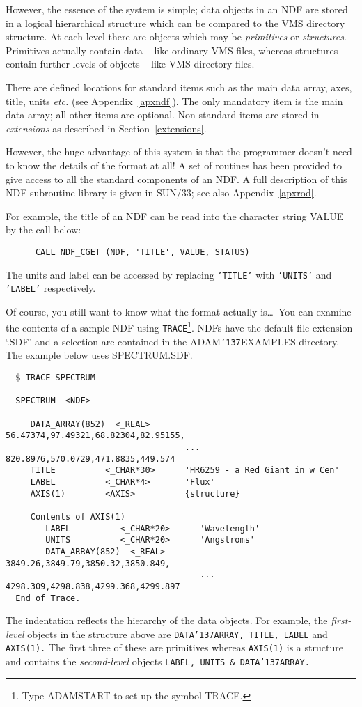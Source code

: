 \documentclass[twoside,11pt]{article}
\renewcommand{\_}{{\tt\char'137}}
\newcommand{\xref}[3]{#1}
\begin{document}
However, the essence of the system is simple; data objects in an NDF
are stored in a
logical hierarchical structure which can be compared to the VMS
directory structure.
At each level there are objects which may be {\sl primitives\/}
or {\sl structures}.
Primitives actually contain data -- like ordinary VMS files, whereas
structures contain further levels of objects -- like VMS directory files.

There are defined locations for standard items such as the main data array,
axes, title, units {\it etc.} (see Appendix~\ref{apxndf}).
The only mandatory item is the main data
array; all other items are optional.
Non-standard items are stored in {\sl extensions\/}
as described in Section~\ref{extensions}.

However, the huge advantage of this system is that the programmer
doesn't need to know the details of the
format at all!
A set of routines has been provided to give access
to all the standard components of an NDF.
A full description of this NDF subroutine library is given in
\xref{SUN/33}{sun33}{};
see also Appendix~\ref{apxrod}.


For example, the title of an NDF can be read into the character string
VALUE by the call below:
\begin{verbatim}
      CALL NDF_CGET (NDF, 'TITLE', VALUE, STATUS)
\end{verbatim}
The units and label can be accessed by replacing
{\tt 'TITLE'} with {\tt 'UNITS'} and {\tt 'LABEL'} respectively.

Of course, you still want to know what the format actually is\ldots\
You can examine the contents of a sample NDF
using {\tt TRACE}\footnote{Type ADAMSTART to set up the symbol TRACE.}.
NDFs have the default file extension `.SDF' and a selection are
contained in the  ADAM\_EXAMPLES directory.
The example below uses SPECTRUM.SDF.
\begin{verbatim}
  $ TRACE SPECTRUM

  SPECTRUM  <NDF>

     DATA_ARRAY(852)  <_REAL>       56.47374,97.49321,68.82304,82.95155,
                                    ... 820.8976,570.0729,471.8835,449.574
     TITLE          <_CHAR*30>      'HR6259 - a Red Giant in w Cen'
     LABEL          <_CHAR*4>       'Flux'
     AXIS(1)        <AXIS>          {structure}

     Contents of AXIS(1)
        LABEL          <_CHAR*20>      'Wavelength'
        UNITS          <_CHAR*20>      'Angstroms'
        DATA_ARRAY(852)  <_REAL>       3849.26,3849.79,3850.32,3850.849,
                                       ... 4298.309,4298.838,4299.368,4299.897
  End of Trace.
\end{verbatim}
The indentation reflects the hierarchy of the data objects.
For example, the {\sl first-level\/} objects in the structure above are
{\tt  DATA\_ARRAY, TITLE, LABEL} and {\tt AXIS(1).}
The first three of these are primitives whereas
{\tt AXIS(1)} is a structure and contains the {\sl second-level\/}
objects {\tt LABEL, UNITS \& DATA\_ARRAY.}
\end{document}
